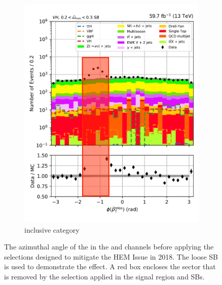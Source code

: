 \begin{figure}[htbp]
\begin{subfigure}[b]{0.4\textwidth}
        \includegraphics[width=\textwidth]{figures/hem_issue/sideband_4/met_phi/met_phi_VH_before_annotated.pdf}
        \caption{\VH inclusive category}
    \end{subfigure}
    \caption[The azimuthal angle of the \ptvecmiss in the \ttH and \VH channels before applying the selections designed to mitigate the HEM Issue in 2018]{The azimuthal angle of the \ptvecmiss in the \ttH and \VH channels before applying the selections designed to mitigate the HEM Issue in 2018. The loose \omegaTilde \gls{SB} is used to demonstrate the effect. A red box encloses the sector that is removed by the selection applied in the signal region and \glspl{SB}.}
    \label{fig:htoinv_hem_issue_met_phi}
\end{figure}
